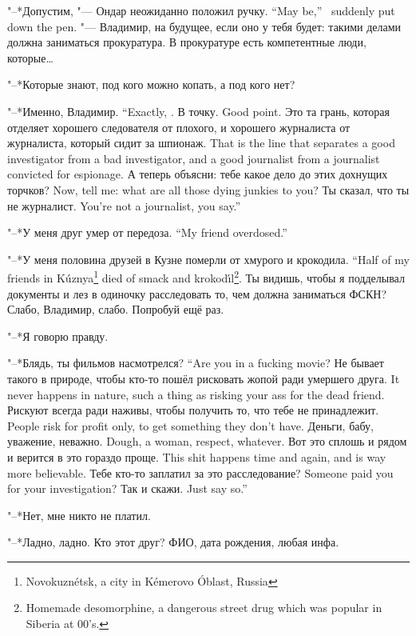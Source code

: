 {"--*Допустим, "--- Ондар неожиданно положил ручку.}
{``May be,'' \Ondar\ suddenly put down the pen.}
"--- Владимир, на будущее, если оно у тебя будет: такими делами должна заниматься прокуратура.
В прокуратуре есть компетентные люди, которые\ldots{}

"--*Которые знают, под кого можно копать, а под кого нет?

{"--*Именно, Владимир.}
{``Exactly, \Vladimir.}
{В точку.}
{Good point.}
{Это та грань, которая отделяет хорошего следователя от плохого, и хорошего журналиста от журналиста, который сидит за шпионаж.}
{That is the line that separates a good investigator from a bad investigator, and a good journalist from a journalist convicted for espionage.}
{А теперь объясни: тебе какое дело до этих дохнущих торчков?}
{Now, tell me: what are all those dying junkies to you?}
{Ты сказал, что ты не журналист.}
{You're not a journalist, you say.''}

{"--*У меня друг умер от передоза.}
{``My friend overdosed.''}

{"--*У меня половина друзей в Кузне померли от хмурого и крокодила.}
{``Half of my friends in K\'uznya\footnote{Novokuzn\'etsk, a city in K\'emerovo \'Oblast, Russia} died of smack and krokod\'{\i}l\footnote{Homemade desomorphine, a dangerous street drug which was popular in Siberia at 00's.}.}
Ты видишь, чтобы я подделывал документы и лез в одиночку расследовать то, чем должна заниматься ФСКН?
Слабо, Владимир, слабо.
Попробуй ещё раз.

"--*Я говорю правду.

{"--*Блядь, ты фильмов насмотрелся?}
{``Are you in a fucking movie?}
{Не бывает такого в природе, чтобы кто-то пошёл рисковать жопой ради умершего друга.}
{It never happens in nature, such a thing as risking your ass for the dead friend.}
{Рискуют всегда ради наживы, чтобы получить то, что тебе не принадлежит.}
{People risk for profit only, to get something they don't have.}
{Деньги, бабу, уважение, неважно.}
{Dough, a woman, respect, whatever.}
{Вот это сплошь и рядом и верится в это гораздо проще.}
{This shit happens time and again, and is way more believable.}
{Тебе кто-то заплатил за это расследование?}
{Someone paid you for your investigation?}
{Так и скажи.}
{Just say so.''}

"--*Нет, мне никто не платил.

"--*Ладно, ладно.
Кто этот друг?
ФИО, дата рождения, любая инфа.


